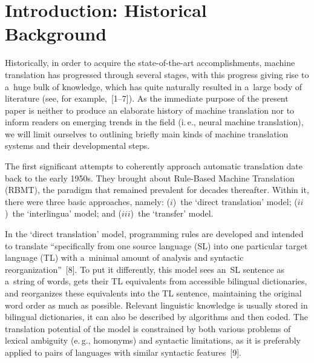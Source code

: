 





      \thispagestyle{myheadings}

      \begin{multicols}{2}

                  \label{st\stat}
     
\section{Introduction: Historical Background}

  \noindent
  Historically, in order to acquire the state-of-the-art accomplishments, machine 
translation has progressed through several stages, with this progress giving rise to 
a~huge bulk of knowledge, which has quite naturally resulted in a~large body of 
literature (see, for example,~[1--7]). As the immediate purpose of the present paper is 
neither to produce an elaborate history of machine translation nor to inform readers 
on emerging trends in the field (i.\,e., neural machine translation), we will limit 
ourselves to outlining briefly main kinds of machine translation systems and their 
developmental steps.
  
  The first significant attempts to coherently approach automatic translation date 
back to the early 1950s. They brought about Rule-Based Machine Translation 
(RBMT), the paradigm that remained prevalent for decades thereafter. Within it, 
there were three basic approaches, namely: ($i$)~the `direct translation' model; 
($ii$)~the `interlingua' model; and ($iii$)~the `transfer' model.
  
  In the `direct translation' model, programming rules are developed and intended 
to translate ``specifically from one source language (SL) into one particular target 
language (TL) with a~minimal amount of analysis and syntactic 
reorganization''~[8]. To put it differently, this model sees an~SL sentence as a~string 
of words, gets their TL equivalents from accessible bilingual dictionaries, and 
reorganizes these equivalents into the TL sentence, maintaining the original word 
order as much as possible. Relevant linguistic knowledge is usually stored in 
bilingual dictionaries, it can also be described by algorithms and then coded. The 
translation potential of the model is constrained by both various problems of 
lexical ambiguity (e.\,g., homonyms) and syntactic limitations, as it is preferably 
applied to pairs of languages with similar syntactic features~[9].
  

\end{multicols}
